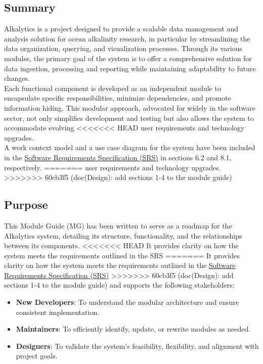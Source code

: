 \documentclass[12pt, titlepage]{article}
\begin{document}
\subsection{Summary}
Alkalytics is a project designed to provide a scalable data management and analysis
solution for ocean alkalinity research, in particular by streamlining the data 
organization, querying, and visualization processes. Through its various modules, 
the primary goal of the system is to offer a comprehensive solution for data 
ingestion, processing and reporting  while maintaining adaptability to future 
changes.\\
\newline
Each functional component is developed as an independent module to encapsulate 
specific responsibilities, minimize dependencies, and promote information
hiding. This modular approach, advocated for widely in the software sector, not only
simplifies development and testing but also allows the system to accommodate evolving
<<<<<<< HEAD
user requirements and technology upgrades.\\
\newline
A work context model and a use case diagram for the system have been included in the 
\href{https://github.com/SumanyaG/Alkalytics/blob/main/docs/SRS/SRS.pdf}{Software Requirements Specification (SRS)} 
in sections 6.2 and 8.1, respectively.
=======
user requirements and technology upgrades.
>>>>>>> 60cb3f5 (doc(Design): add sections 1-4 to the module guide)

\subsection{Purpose}
This Module Guide (MG) has been written to serve as a roadmap for the Alkalytics system,
detailing its structure, functionality, and the relationships between its components.
<<<<<<< HEAD
It provides clarity on how the system meets the requirements outlined in the SRS
=======
It provides clarity on how the system meets the requirements outlined in the 
\href{https://github.com/SumanyaG/Alkalytics/blob/main/docs/SRS/SRS.pdf}{Software Requirements Specification (SRS)}
>>>>>>> 60cb3f5 (doc(Design): add sections 1-4 to the module guide)
and supports the following stakeholders:
\begin{itemize}
  \item \textbf{New Developers}: To understand the modular architecture and ensure
  consistent implementation.
  \item \textbf{Maintainers}: To efficiently identify, update, or rewrite modules as needed.
  \item \textbf{Designers}: To validate the system's feasibility, flexibility, and alignment
  with project goals. 
\end{itemize}
\end{document}
